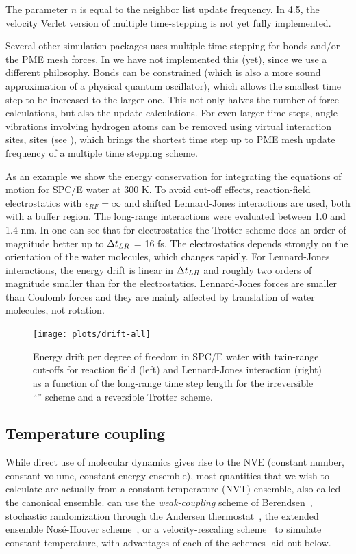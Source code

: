 The parameter $n$ is equal to the neighbor list update frequency. In
4.5, the velocity Verlet version of multiple time-stepping is not yet
fully implemented.

Several other simulation packages uses multiple time stepping for
bonds and/or the PME mesh forces. In {\gromacs} we have not implemented
this (yet), since we use a different philosophy. Bonds can be constrained
(which is also a more sound approximation of a physical quantum
oscillator), which allows the smallest time step to be increased
to the larger one. This not only halves the number of force calculations,
but also the update calculations. For even larger time steps, angle vibrations
involving hydrogen atoms can be removed using virtual interaction
{sites,}
{sites (see ),}
which brings the shortest time step up to
PME mesh update frequency of a multiple time stepping scheme.

As an example we show the energy conservation for integrating
the equations of motion for SPC/E water at 300 K. To avoid cut-off
effects, reaction-field electrostatics with $\epsilon_{RF}=\infty$ and
shifted Lennard-Jones interactions are used, both with a buffer region.
The long-range interactions were evaluated between 1.0 and 1.4 nm.
In  one can see that for electrostatics the Trotter scheme
does an order of magnitude better up to  ${\Delta t}_{LR}$ = 16 fs.
The electrostatics depends strongly on the orientation of the water molecules,
which changes rapidly.
For Lennard-Jones interactions, the energy drift is linear in ${\Delta t}_{LR}$
and roughly two orders of magnitude smaller than for the electrostatics.
Lennard-Jones forces are smaller than Coulomb forces and
they are mainly affected by translation of water molecules, not rotation.

\begin{figure}
\centerline{\texttt{[image: plots/drift-all]}}
\caption{Energy drift per degree of freedom in SPC/E water
with twin-range cut-offs
for reaction field (left) and Lennard-Jones interaction (right)
as a function of the long-range time step length for the irreversible
``\gromos'' scheme and a reversible Trotter scheme.}
\label{fig:twinrangeener}
\end{figure}

\subsection{Temperature coupling}
While direct use of molecular dynamics gives rise to the NVE (constant
number, constant volume, constant energy ensemble), most quantities
that we wish to calculate are actually from a constant temperature
(NVT) ensemble, also called the canonical ensemble. {\gromacs} can use
the {\em weak-coupling} scheme of Berendsen~\cite{Berendsen84},
stochastic randomization through the Andersen
thermostat~\cite{Andersen80}, the extended ensemble Nos{\'e}-Hoover
scheme~\cite{Nose84,Hoover85}, or a velocity-rescaling
scheme~\cite{Bussi2007a} to simulate constant temperature, with
advantages of each of the schemes laid out below.

